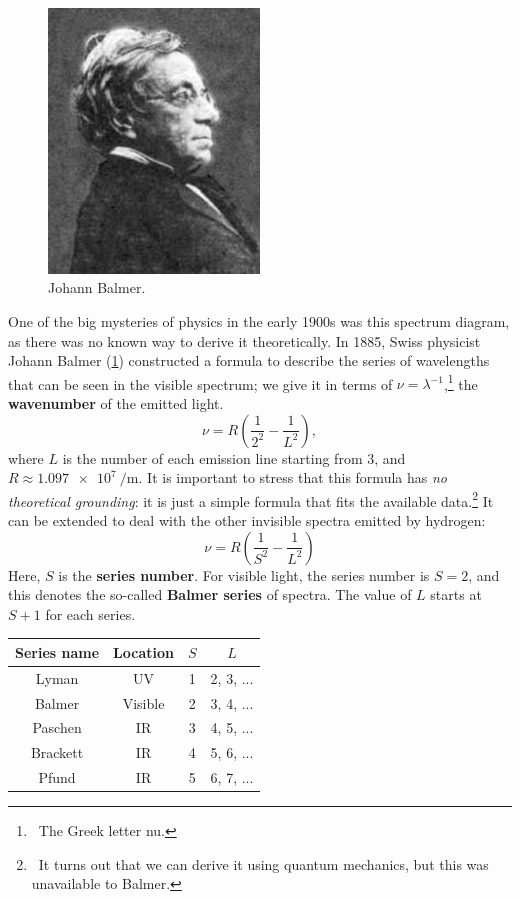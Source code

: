 \documentclass[a4paper]{amsbook}
\theoremstyle{definition}
\numberwithin{exercise}{chapter}
\numberwithin{exercise}{chapter}
\begin{document}
\begin{figure}
  \centering
  \includegraphics[width=0.5\textwidth]{balmer}
  \caption{Johann Balmer. \label{fig:balmer}}
\end{figure}

One of the big mysteries of physics in the early 1900s was this spectrum diagram, as there was no known way to derive it theoretically. In 1885,
Swiss physicist Johann Balmer (\cref{fig:balmer}) constructed a formula to describe the series of wavelengths that can be seen in the visible spectrum;
we give it in terms of $ \nu = \lambda^{-1} $,\footnote{~The Greek letter nu.} the \textbf{wavenumber} of the emitted light.
\begin{equation}
  \nu = R\left( \frac{1}{2^2} - \frac{1}{L^2} \right),
\end{equation}
where $ L $ is the number of each emission line starting from 3, and $ R \approx \SI{1.097e7}{\per\metre} $. It is important to stress that this
formula has \emph{no theoretical grounding}: it is just a simple formula that fits the available data.\footnote{~It turns out that we can derive it using
quantum mechanics, but this was unavailable to Balmer.} It can be extended to deal with the other invisible spectra emitted by hydrogen:
\begin{displaymath}
  \nu = R\left( \frac{1}{S^2} - \frac{1}{L^2} \right)
\end{displaymath}
Here, $ S $ is the \textbf{series number}. For visible light, the series number is $ S = 2 $, and this denotes the
so-called \textbf{Balmer series} of spectra. The value of $ L $ starts at $ S + 1 $ for each series.

\begin{center}
  \def\arraystretch{1.5}
  \begin{tabular}{|c|c|c|c|}\hline
    \textbf{Series name} & \textbf{Location} & $ S $ & $ L $\\\hline
    Lyman & UV & 1 & 2, 3, ...\\
    Balmer & Visible & 2 & 3, 4, ...\\
    Paschen & IR & 3 & 4, 5, ...\\
    Brackett & IR & 4 & 5, 6, ...\\
    Pfund & IR & 5 & 6, 7, ...\\\hline
  \end{tabular}
\end{center}
\end{document}
